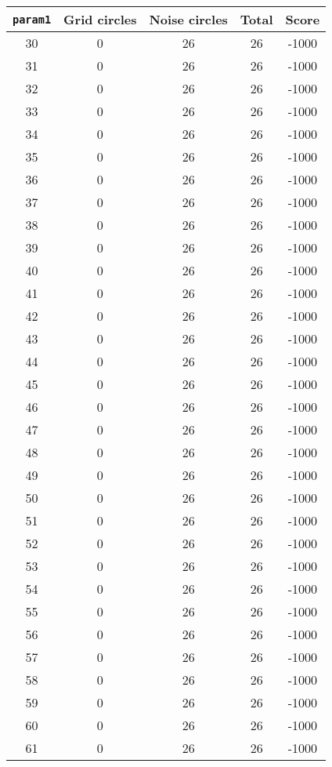 \documentclass[letterpaper, 12pt]{article}
\begin{document}
\begin{longtable}{|c|c|c|c|c|}
\hline
\textbf{\texttt{param1}} & \textbf{Grid circles} & \textbf{Noise circles} & \textbf{Total} & \textbf{Score} \\
\hline
30 & 0 & 26 & 26 & -1000 \\
\hline
31 & 0 & 26 & 26 & -1000 \\
\hline
32 & 0 & 26 & 26 & -1000 \\
\hline
33 & 0 & 26 & 26 & -1000 \\
\hline
34 & 0 & 26 & 26 & -1000 \\
\hline
35 & 0 & 26 & 26 & -1000 \\
\hline
36 & 0 & 26 & 26 & -1000 \\
\hline
37 & 0 & 26 & 26 & -1000 \\
\hline
38 & 0 & 26 & 26 & -1000 \\
\hline
39 & 0 & 26 & 26 & -1000 \\
\hline
40 & 0 & 26 & 26 & -1000 \\
\hline
41 & 0 & 26 & 26 & -1000 \\
\hline
42 & 0 & 26 & 26 & -1000 \\
\hline
43 & 0 & 26 & 26 & -1000 \\
\hline
44 & 0 & 26 & 26 & -1000 \\
\hline
45 & 0 & 26 & 26 & -1000 \\
\hline
46 & 0 & 26 & 26 & -1000 \\
\hline
47 & 0 & 26 & 26 & -1000 \\
\hline
48 & 0 & 26 & 26 & -1000 \\
\hline
49 & 0 & 26 & 26 & -1000 \\
\hline
50 & 0 & 26 & 26 & -1000 \\
\hline
51 & 0 & 26 & 26 & -1000 \\
\hline
52 & 0 & 26 & 26 & -1000 \\
\hline
53 & 0 & 26 & 26 & -1000 \\
\hline
54 & 0 & 26 & 26 & -1000 \\
\hline
55 & 0 & 26 & 26 & -1000 \\
\hline
56 & 0 & 26 & 26 & -1000 \\
\hline
57 & 0 & 26 & 26 & -1000 \\
\hline
58 & 0 & 26 & 26 & -1000 \\
\hline
59 & 0 & 26 & 26 & -1000 \\
\hline
60 & 0 & 26 & 26 & -1000 \\
\hline
61 & 0 & 26 & 26 & -1000 \\

\end{longtable}
\end{document}
